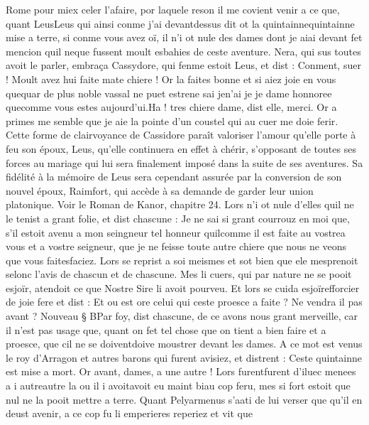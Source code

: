 \documentclass{article}
\begin{document}
\begin{pages}
   Rome pour miex celer l’afaire, por laquele reson il me covient venir a ce 
   que, quant LeusLeus qui 
   ainsi conme j’ai devantdessus dit ot la
   quintainnequintainne mise a terre, 
   si conme vous avez oï,
   il n’i ot nule des dames dont je aiai devant fet mencion
   quil neque fussent moult esbahies de ceste aventure. 
   Nera, qui sus toutes avoit le parler, embraça Cassydore, 
   qui fenme estoit Leus, et dist :
   Conment, suer ! Moult avez hui faite mate chiere ! Or la faites bonne et
      si aiez joie en vous quequar de plus noble vassal 
      ne puet estrene sai jen'ai je je dame honnoree 
      quecomme vous estes aujourd’ui.Ha ! tres chiere dame, dist elle, merci. Or a primes me semble que je aie la pointe 
      d’un coustel qui au cuer me doie ferir. Cette forme de clairvoyance de Cassidore 
      paraît valoriser l'amour qu'elle porte à feu son époux, Leus, qu'elle continuera en effet à chérir, s'opposant de toutes ses
      forces au mariage qui lui sera finalement imposé dans la suite de ses aventures. Sa fidélité à la mémoire de Leus sera cependant
      assurée par la conversion de son nouvel époux, Raimfort, qui accède à sa demande de garder leur union platonique.
      Voir le Roman de Kanor, chapitre 24.
   Lors n’i ot nule d’elles quil ne le tenist a grant folie, et dist chascune :
   Je ne sai si grant courrouz en moi que, s’il estoit avenu a mon seingneur tel honneur 
      quilcomme il est faite 
      au vostrea vous et a vostre seigneur, que je ne feisse 
      toute autre chiere que nous ne veons que vous faitesfaciez.
   Lors se reprist a soi meismes et sot bien que ele mesprenoit selonc l’avis de 
   chascun et de chascune. Mes li cuers, qui par nature ne se pooit esjoïr, atendoit ce que Nostre Sire li avoit pourveu.
   Et lors se cuida esjoïrefforcier de joie fere et dist :
   Et ou est ore celui qui ceste proesce a faite ? Ne vendra il pas avant ?
   Nouveau § BPar foy, dist chascune, de ce avons nous grant merveille, 
      car il n’est pas usage que, 
      quant on fet tel chose que on tient a bien faire et a proesce, 
      que cil ne se doiventdoive moustrer devant les dames.
   A ce mot est venus le roy d’Arragon 
   et autres barons qui furent avisiez, et distrent :
   Ceste quintainne est mise a mort. Or avant, dames, a une autre !
   Lors furentfurent d'iluec menees a i 
   autreautre la 
   ou il i avoitavoit eu maint biau cop feru,
   mes si fort estoit que nul ne la pooit mettre a terre. Quant Pelyarmenus s’aati de lui verser 
   que qu’il en deust avenir, a ce cop fu li emperieres reperiez et vit que

\end{pages}
\end{document}
